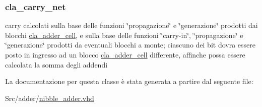 \subsubsection[{\texorpdfstring{cla\+\_\+net}{cla_net}}]{ {\bfseries \textcolor{vhdlchar}{cla\+\_\+carry\+\_\+net}\textcolor{vhdlchar}{ }} \hspace{0.3cm}{\ttfamily [Instantiation]}}\hypertarget{classnibble__adder_1_1structural_abbf8fdf15c2d70392ab929c8ebe57439}{}\label{classnibble__adder_1_1structural_abbf8fdf15c2d70392ab929c8ebe57439}
carry calcolati sulla base delle funzioni \char`\"{}propagazione\char`\"{} e \char`\"{}generazione\char`\"{} prodotti dai blocchi \hyperlink{classcla__adder__cell}{cla\+\_\+adder\+\_\+cell}, e sulla base delle funzioni \char`\"{}carry-\/in\char`\"{}, \char`\"{}propagazione\char`\"{} e \char`\"{}generazione\char`\"{} prodotti da eventuali blocchi a monte; ciascuno dei bit dovra\textquotesingle{} essere posto in ingresso ad un blocco \hyperlink{classcla__adder__cell}{cla\+\_\+adder\+\_\+cell} differente, affinche\textquotesingle{} possa essere calcolata la somma degli addendi 

La documentazione per questa classe è stata generata a partire dal seguente file\+:\begin{DoxyCompactItemize}
\item 
Src/adder/\hyperlink{nibble__adder_8vhd}{nibble\+\_\+adder.\+vhd}\end{DoxyCompactItemize}
